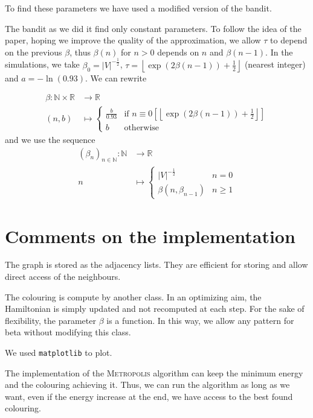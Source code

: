 \documentclass[a4paper, 11pt]{article}
\newcommand{\RR}{\mathbb{R}}
\newcommand{\NN}{\mathbb{N}}
\newcommand{\floor}[1]{{\left\lfloor #1 \right\rfloor}}
\begin{document}
To find these parameters we have used a modified version of the bandit. 

The bandit as we did it find only constant parameters. To follow the idea of the paper, hoping we improve the quality of the approximation, we allow $\tau$ to depend on the previous $\beta$, thus $\beta(n)$ for $n>0$ depends on $n$ and $\beta(n-1)$. In the simulations, we take $\beta_0 = {\lvert V\rvert}^{-\frac{1}{2}}$, $\tau = \floor{\exp(2\beta(n-1))+\frac{1}{2}}$ (nearest integer) and $a = -\ln(0.93)$. We can rewrite

\[
	\begin{aligned}
		\beta : \NN\times\RR &\to \RR\\
		(n, b) &\mapsto \begin{cases} \frac{b}{0.93} & \text{if } n \equiv 0\left[\floor{\exp(2\beta(n-1))+\frac{1}{2}}\right] \\ b & \text{otherwise}\end{cases}
	\end{aligned}
\]
and we use the sequence
\[
	\begin{aligned}
		\left(\beta_n\right)_{n\in\NN} : \NN &\to \RR\\
		n &\mapsto \begin{cases} {\lvert V\rvert}^{-\frac{1}{2}} & n = 0 \\ \beta(n, \beta_{n-1}) & n \geqslant 1 \end{cases}
	\end{aligned}
\]

\section{Comments on the implementation}

The graph is stored as the adjacency lists. They are efficient for storing and allow direct access of the neighbours.

The colouring is compute by another class. In an optimizing aim, the Hamiltonian is simply updated and not recomputed at each step. For the sake of flexibility, the parameter $\beta$ is a function. In this way, we allow any pattern for beta without modifying this class.

We used \texttt{matplotlib} to plot.

The implementation of the \textsc{Metropolis} algorithm can keep the minimum energy and the colouring achieving it. Thus, we can run the algorithm as long as we want, even if the energy increase at the end, we have access to the best found colouring.
\end{document}
